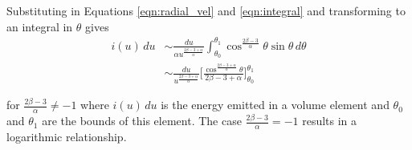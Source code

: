 Substituting in Equations \ref{eqn:radial_vel} and \ref{eqn:integral} and transforming to an integral in $\theta$ gives
\begin{equation}
\begin{split}
i(u) \, du &\sim \frac{du}{\alpha u^{\frac{2\beta-3+\alpha}{\alpha}}} \int^{\theta_1}_{\theta_0} \cos^{\frac{2\beta-3}{\alpha}} \theta \sin \theta \, d\theta 
\\
&\sim  \frac{du}{u^{\frac{2\beta-3+\alpha}{\alpha}}} \Bigg[\frac{\cos^{\frac{2\beta - 3 + \alpha}{\alpha}} \theta}{2\beta -3 + \alpha}\Bigg]^{\theta_1}_{\theta_0}
\end{split}
\end{equation}

\noindent for $\frac{2\beta-3}{\alpha} \neq -1$ where $i(u) \,du$ is the energy emitted in a volume element and $\theta_0$ and $\theta_1$ are the bounds of this element.  The case $\frac{2\beta-3}{\alpha} = -1$ results in a logarithmic relationship.


